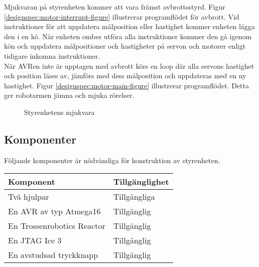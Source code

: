Mjukvaran på styrenheten kommer att vara främst avbrottsstyrd. Figur \ref{designspec:motor-interrupt-figure} illustrerar programflödet för avbrott. Vid instruktioner för att uppdatera målposition eller hastighet kommer enheten lägga den i en kö. När enheten ombes utföra alla instruktioner kommer den gå igenom kön och uppdatera målpositioner och hastigheter på servon och motorer enligt tidigare inkomna instruktioner. \\
När AVRen inte är upptagen med avbrott körs en loop där alla servons hastighet och position läses av, jämförs med dess målposition och uppdateras med en ny hastighet. Figur \ref{designspec:motor-main-figure} illustrerar programflödet. Detta ger robotarmen jämna och mjuka rörelser. \\

\begin{figure}
\centering
\begin{minipage}[b]{.5\linewidth}
\centering
\scalebox{0.7}{}
\label{designspec:motor-interrupt-figure}
\end{minipage}%
\begin{minipage}[b]{.5\linewidth}
\centering
\scalebox{0.7}{}
\label{designspec:motor-main-figure}
\end{minipage}
\caption{Styrenhetens mjukvara}\label{fig:1}
\end{figure}

\subsection{Komponenter}
Följande komponenter är nödvändiga för konstruktion av styrenheten. \\
\begin{tabularx}{\textwidth}{| l | X |}
	\hline
	{\textbf{Komponent}} & {\textbf{Tillgänglighet}} \\\hline
	{Två hjulpar} & {Tillgängliga} \\\hline
	{En AVR av typ Atmega16} & {Tillgänglig} \\\hline
	{En Trossenrobotics Reactor} & {Tillgänglig} \\\hline
	{En JTAG Ice 3} & {Tillgänglig} \\\hline
	{En avstudsad tryckknapp} & {Tillgänglig} \\\hline
\end{tabularx}